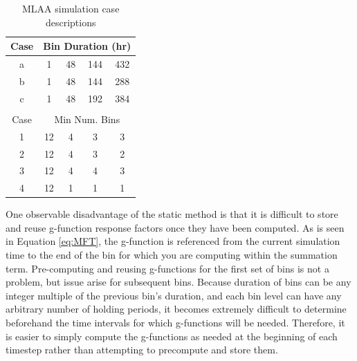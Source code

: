 \documentclass[review,12pt]{elsarticle}
\begin{document}
\begin{table}[htbp!]
\centering
\caption{MLAA simulation case descriptions}
\label{tab:MLAA cases}
\begin{tabular}{ccccc}
Case                    & \multicolumn{4}{c}{Bin Duration (hr)}                                                                   \\ \hline
\multicolumn{1}{|c|}{a} & \multicolumn{1}{c|}{1}  & \multicolumn{1}{c|}{48} & \multicolumn{1}{c|}{144} & \multicolumn{1}{c|}{432} \\ \hline
\multicolumn{1}{|c|}{b} & \multicolumn{1}{c|}{1}  & \multicolumn{1}{c|}{48} & \multicolumn{1}{c|}{144} & \multicolumn{1}{c|}{288} \\ \hline
\multicolumn{1}{|c|}{c} & \multicolumn{1}{c|}{1}  & \multicolumn{1}{c|}{48} & \multicolumn{1}{c|}{192} & \multicolumn{1}{c|}{384} \\ \hline
                        &                         &                         &                          &                          \\
Case                    & \multicolumn{4}{c}{Min Num. Bins}                                                                             \\ \hline
\multicolumn{1}{|c|}{1} & \multicolumn{1}{c|}{12} & \multicolumn{1}{c|}{4}  & \multicolumn{1}{c|}{3}   & \multicolumn{1}{c|}{3}   \\ \hline
\multicolumn{1}{|c|}{2} & \multicolumn{1}{c|}{12} & \multicolumn{1}{c|}{4}  & \multicolumn{1}{c|}{3}   & \multicolumn{1}{c|}{2}   \\ \hline
\multicolumn{1}{|c|}{3} & \multicolumn{1}{c|}{12} & \multicolumn{1}{c|}{4}  & \multicolumn{1}{c|}{4}   & \multicolumn{1}{c|}{3}   \\ \hline
\multicolumn{1}{|c|}{4} & \multicolumn{1}{c|}{12} & \multicolumn{1}{c|}{1}  & \multicolumn{1}{c|}{1}   & \multicolumn{1}{c|}{1}   \\ \hline
\end{tabular}
\end{table}

One observable disadvantage of the static method is that it is difficult to store and reuse g-function response factors once they have been computed. As is seen in Equation \ref{eq:MFT}, the g-function is referenced from the current simulation time to the end of the bin for which you are computing within the summation term. Pre-computing and reusing g-functions for the first set of bins is not a problem, but issue arise for subsequent bins. Because duration of bins can be any integer multiple of the previous bin's duration, and each bin level can have any arbitrary number of holding periods, it becomes extremely difficult to determine beforehand the time intervals for which g-functions will be needed. Therefore, it is easier to simply compute the g-functions as needed at the beginning of each timestep rather than attempting to precompute and store them.
\end{document}
